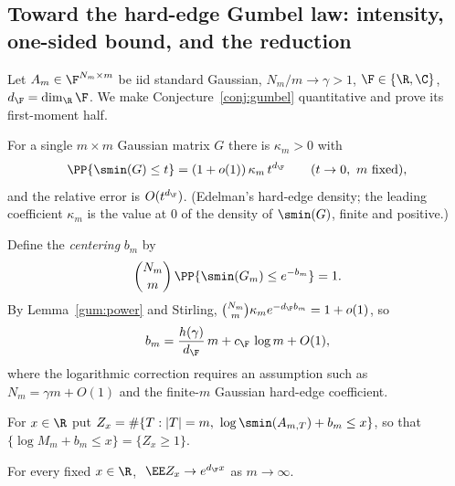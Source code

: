 
\subsection*{Toward the hard-edge Gumbel law: intensity, one-sided bound, and the reduction}

Let $A_m\in\F^{N_m\times m}$ be iid standard Gaussian, $N_m/m\to\gamma>1$,
$\F\in\{\R,\C\}$, $d_\F=\dim_\R\F$.  We make Conjecture~\ref{conj:gumbel} quantitative
and prove its first-moment half.

\begin{lemma}\label{gum:power}
For a single $m\times m$ Gaussian matrix $G$ there is $\kappa_m>0$ with
\[
  \PP\{\smin(G)\le t\}=(1+o(1))\,\kappa_m\,t^{d_\F}\qquad(t\to0,\ m\ \text{fixed}),
\]
and the relative error is $O(t^{d_\F})$.  (Edelman's hard-edge density; the leading
coefficient $\kappa_m$ is the value at $0$ of the density of $\smin(G)$, finite and
positive.)
\end{lemma}

Define the \emph{centering} $b_m$ by
\begin{equation}\label{gum:bm}
  \binom{N_m}{m}\,\PP\{\smin(G_m)\le e^{-b_m}\}=1 .
\end{equation}
By Lemma~\ref{gum:power} and Stirling, $\binom{N_m}{m}\kappa_m e^{-d_\F b_m}=1+o(1)$, so
\begin{equation}\label{gum:bm-asymp}
  b_m=\frac{h(\gamma)}{d_\F}\,m+c_\F\,\log m+O(1),
\end{equation}
where the logarithmic correction requires an assumption such as
$N_m=\gamma m+O(1)$ and the finite-$m$ Gaussian hard-edge coefficient.

For $x\in\R$ put $Z_x=\#\{T:|T|=m,\ \log\smin(A_{m,T})+b_m\le x\}$, so that
$\{\log M_m+b_m\le x\}=\{Z_x\ge1\}$.

\begin{proposition}[Intensity]\label{gum:intensity}
For every fixed $x\in\R$, $\ \EE Z_x\to e^{d_\F x}$ as $m\to\infty$.
\end{proposition}

